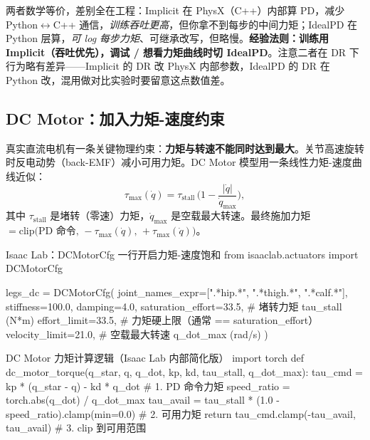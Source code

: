 \begin{insight}\label{ins:rlmc-act-implicit}
两者数学等价，差别全在工程：Implicit 在 PhysX（C++）内部算 PD，减少 Python$\leftrightarrow$C++ 通信，\emph{训练吞吐更高}，但你拿不到每步的中间力矩；IdealPD 在 Python 层算，\emph{可 log 每步力矩}、可继承改写，但略慢。\textbf{经验法则：训练用 Implicit（吞吐优先），调试 / 想看力矩曲线时切 IdealPD}。注意二者在 DR 下行为略有差异——Implicit 的 DR 改 PhysX 内部参数，IdealPD 的 DR 在 Python 改，混用做对比实验时要留意这点数值差。
\end{insight}

\subsection{DC Motor：加入力矩-速度约束}
\label{sec:rlmc-act-dcmotor}

真实直流电机有一条关键物理约束：\textbf{力矩与转速不能同时达到最大}。关节高速旋转时反电动势（back-EMF）减小可用力矩。DC Motor 模型用一条线性力矩-速度曲线近似：
\begin{equation}
\tau_{\max}(\dot q) = \tau_{\mathrm{stall}}\,\Big(1 - \frac{|\dot q|}{\dot q_{\max}}\Big),
\label{eq:rlmc-act-torquespeed}
\end{equation}
其中 $\tau_{\mathrm{stall}}$ 是堵转（零速）力矩，$\dot q_{\max}$ 是空载最大转速。最终施加力矩 $= \mathrm{clip}\big(\text{PD 命令},\,-\tau_{\max}(\dot q),\,+\tau_{\max}(\dot q)\big)$。

\begin{codebox}[Python]{Isaac Lab：DCMotorCfg 一行开启力矩-速度饱和}
from isaaclab.actuators import DCMotorCfg

legs_dc = DCMotorCfg(
    joint_names_expr=[".*hip.*", ".*thigh.*", ".*calf.*"],
    stiffness=100.0, damping=4.0,
    saturation_effort=33.5,  # 堵转力矩 tau_stall (N*m)
    effort_limit=33.5,       # 力矩硬上限（通常 == saturation_effort）
    velocity_limit=21.0,     # 空载最大转速 q_dot_max (rad/s)
)
\end{codebox}

\begin{codebox}[Python]{DC Motor 力矩计算逻辑（Isaac Lab 内部简化版）}
import torch
def dc_motor_torque(q_star, q, q_dot, kp, kd, tau_stall, q_dot_max):
    tau_cmd = kp * (q_star - q) - kd * q_dot          # 1. PD 命令力矩
    speed_ratio = torch.abs(q_dot) / q_dot_max
    tau_avail = tau_stall * (1.0 - speed_ratio).clamp(min=0.0)  # 2. 可用力矩
    return tau_cmd.clamp(-tau_avail, tau_avail)        # 3. clip 到可用范围
\end{codebox}


